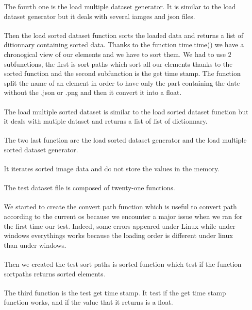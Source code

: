 \documentclass[12pt]{article}
\begin{document}
The fourth one is the load multiple dataset generator. It is similar to the load dataset generator but it deals with several iamges and json files.\\ \\

Then the load sorted dataset function sorts the loaded data and returns a list of ditionnary containing sorted data. Thanks to the function time.time() we have a chronogical view of our elements and we have to sort them. We had to use 2 subfunctions, the first is sort paths which sort all our elements thanks to the sorted function and the second subfunction is the get time stamp. The function split the name of an element in order to have only the part containing the date without the .json or .png  and then it convert it into a float.\\ \\


The load multiple sorted dataset is similar to the load sorted dataset function but it deals with mutiple dataset and returns a list of list of dictionnary.\\ \\

The two last function are the load sorted dataset generator and the load multiple sorted dataset generator.\\ \\
It iterates sorted image data and do not store the values in the memory.\\ \\



The test dataset file is composed of twenty-one functions.\\ \\

We started to create the convert path function which is useful to convert path according to the current os because we encounter a major issue when we ran for the first time our test. Indeed, some errors appeared under Linux while under windows everythings works because the loading order is different under linux than under windows.\\ \\

Then we created the test sort paths is sorted function which test if the function  sortpaths returns sorted elements. \\ \\

The third function is the test get time stamp. It test if the get time stamp function works, and if the value that it returns is a float. \\ \\
\end{document}

